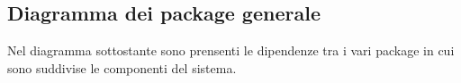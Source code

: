 		\subsection{Diagramma dei package generale}

		Nel diagramma sottostante sono prensenti le dipendenze tra i vari package in cui sono suddivise le componenti del sistema.









